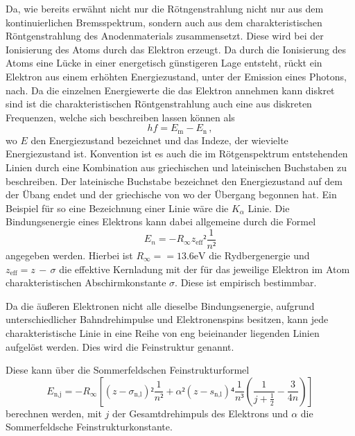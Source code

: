 \noindent
Da, wie bereits erwähnt nicht nur die Rötngenstrahlung nicht nur aus dem kontinuierlichen Bremsspektrum, sondern auch aus dem charakteristischen Röntgenstrahlung des Anodenmaterials 
zusammensetzt. Diese wird bei der Ionisierung des Atoms durch das Elektron erzeugt. Da durch die Ionisierung des Atoms eine Lücke in einer energetisch günstigeren Lage entsteht, rückt ein
Elektron aus einem erhöhten Energiezustand, unter der Emission eines Photons, nach. Da die einzelnen Energiewerte die das Elektron annehmen kann diskret sind ist die charakteristischen Röntgenstrahlung
auch eine aus diskreten Frequenzen, welche sich beschreiben lassen können als 
\begin{equation}
    h f = E_\text{m} - E_\text{n} \, ,
\end{equation}
wo $E$ den Energiezustand bezeichnet und das Indeze, der wievielte Energiezustand ist.  Konvention ist es auch die im Rötgenspektrum entstehenden Linien durch eine Kombination aus griechischen
und lateinischen Buchstaben zu beschreiben. Der lateinische Buchstabe bezeichnet den Energiezustand auf dem der Übang endet und der griechische von wo der Übergang begonnen hat. Ein Beispiel
für so eine Bezeichnung einer Linie wäre die $K_\alpha$ Linie.
Die Bindungsenergie eines Elektrons kann dabei allgemeine durch die Formel 
\begin{equation}
    E_n = -R_{\infty} z_\text{eff}² \frac{1}{n²}
    \label{eqn:std}
\end{equation}
\noindent
angegeben werden. Hierbei ist $R_\infty = = 13.6 \si{\eV}$ die Rydbergenergie und $z_\text{eff} = z \, - \, \sigma$ die effektive Kernladung mit der für das jeweilige Elektron im Atom charakteristischen 
Abschirmkonstante $\sigma$. Diese ist empirisch bestimmbar.

\noindent
Da die äußeren Elektronen nicht alle dieselbe Bindungsenergie, aufgrund unterschiedlicher Bahndrehimpulse und Elektronenspins besitzen, kann jede charakteristische Linie in eine Reihe
von eng beieinander liegenden Linien aufgelöst werden. Dies wird die Feinstruktur genannt. 

\noindent
Diese kann über die Sommerfeldschen Feinstrukturformel 
\begin{equation}
    E_{\text{n}, \text{j}} = -R_{\infty} \left[(z-\sigma_{\text{n}, \text{l}})²\frac{1}{n²}+\alpha²(z-s_{\text{n}, \text{l}})⁴\frac{1}{n³}\left(\frac{1}{j+\frac{1}{2}}-\frac{3}{4n}\right)\right]
   \end{equation}
berechnen werden, mit $j$ der Gesamtdrehimpuls des Elektrons und $\alpha$ die Sommerfeldsche Feinstrukturkonstante.

